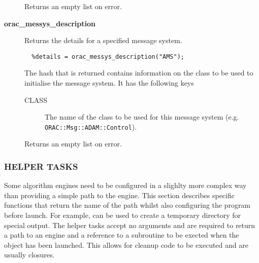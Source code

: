 \begin{description}
\begin{description}
\end{description}


Returns an empty list on error.

\item[\textbf{orac\_messys\_description}] \mbox{}

Returns the details for a specified message system.

\begin{verbatim}
  %details = orac_messys_description("AMS");
\end{verbatim}


The hash that is returned contains information on the
class to be used to initialise the message system.
It has the following keys

\begin{description}
\item[CLASS] \mbox{}

The name of the class to be used for this message system
(e.g. \texttt{ORAC::Msg::ADAM::Control}).

\end{description}


Returns an empty list on error.

\end{description}
\subsubsection*{HELPER TASKS\label{ORAC::Inst::Defn_HELPER_TASKS}}

Some algorithm engines need to be configured in a slighlty more complex
way than providing a simple path to the engine. This section
describes specific functions that return the name of the path whilst
also configuring the program before launch. For example, can be used
to create a temporary directory for special output. The helper tasks
accept no arguments and are required to return a path to an
engine and a reference to a subroutine to be exected when the
object has been launched. This allows for cleanup code to be executed
and are usually closures.


